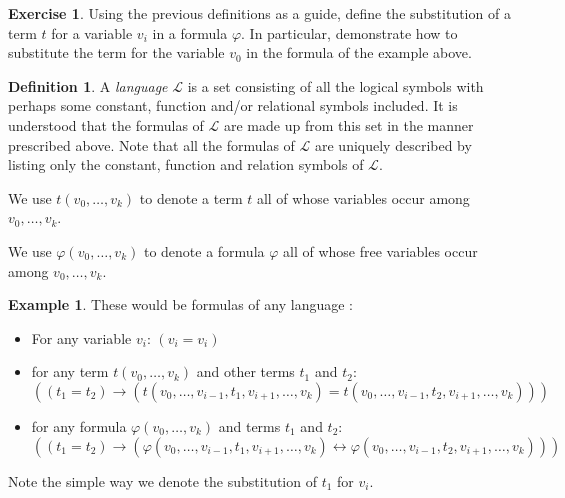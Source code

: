 \documentclass[titlepage, oneside]{amsbook}
\theoremstyle{plain}
\theoremstyle{definition}
\newtheorem{exercise}{Exercise}
\newtheorem{examples}{Example}
\newtheorem{definition}{Definition}
\theoremstyle{remark}
\newcommand{\lan}{\ensuremath{\mathcal{L}}}
\begin{document}
\begin{exercise}\label{E:recon}
Using the previous definitions as a guide, define the substitution of a
term $t$ for a variable $v_{i}$ in a formula $\varphi$.
In particular, demonstrate how to substitute the term for the variable $v_0$ 
in the formula of the example above.
\end{exercise}


\begin{definition}
%
 A \emph{language} $\mathcal{L}$ is a set consisting of
all 
the logical symbols with perhaps some constant, function 
and/or   relational symbols included. It is understood that 
the formulas of 
$\mathcal{L}$ are     made up from this set in the manner prescribed above.  
Note that all the formulas of  $\mathcal{L}$ are uniquely described
by listing only the 
constant, function and relation symbols of $\lan$. 

\end{definition}

We use $t(v_{0}, \dots , v_{k} ) $ to denote a term $t$ all of whose 
variables occur among $v_{0}, \dots , v_{k}$.

We use $\varphi (v_{0}, \dots , v_{k}) $ to denote a formula $\varphi$ 
all of whose free variables occur among $v_{0}, \dots , v_{k}$.



\begin{examples}\label{X:form}
These would be formulas of any language :

\begin{itemize}
\item For any variable $v_i$: $(v_i = v_i )$
\item for any term $t(v_{0}, \dots , v_{k})$ and other terms $t_1$ and 
$t_2$: \[ ((t_1 = t_2 ) \to (t(v_{0},
\dots , v_{i-1} , t_1 , v_{i+1} , \dots , 
v_{k} ) = t (v_{0}, \dots , v_{i-1}, t_2 , v_{i+1}, \dots , v_{k})))\]   
\item for any  formula $\varphi(v_{0}, \dots ,v_{k})$ and terms
$t_1$ and $t_2$:             
 \[ ((t_1 = t_2 ) \to (\varphi ( v_{0}, \dots , v_{i-1} , t_1 , v_{i+1} , 
\dots , v_{k} )  \leftrightarrow  \varphi (v_{0}, \dots , v_{i-1}, t_2
, v_{i+1},
\dots ,
 v_{k}))) \] 
\end{itemize} 
Note the simple way we denote the substitution of $t_1$ for $v_i$.
\end{examples}
\end{document}
